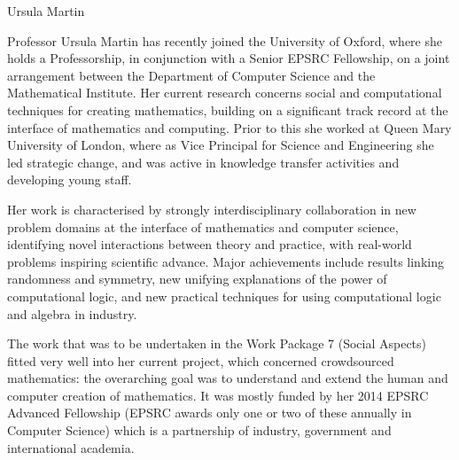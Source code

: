 \begin{participant}[type=PI,PM=2,gender=female]{Ursula Martin}

  Professor Ursula Martin has recently joined the University of Oxford, where she holds a
  Professorship, in conjunction with a Senior EPSRC Fellowship, on a joint arrangement
  between the Department of Computer Science and the Mathematical Institute. Her current
  research concerns social and computational techniques for creating mathematics, building
  on a significant track record at the interface of mathematics and computing. Prior to
  this she worked at Queen Mary University of London, where as Vice Principal for Science
  and Engineering she led strategic change, and was active in knowledge transfer
  activities and developing young staff.

Her work is characterised by strongly interdisciplinary collaboration in new
problem domains at the interface of mathematics and computer science,
identifying novel interactions between theory and practice, with real-world
problems inspiring scientific advance. Major achievements include results
linking randomness and symmetry, new unifying explanations of the power of
computational logic, and new practical techniques for using computational logic
and algebra in industry.

The work that was to be undertaken in the Work Package 7 (Social Aspects) fitted very well
into her current project, which concerned crowdsourced mathematics: the overarching goal was
to understand and extend the human and computer creation of mathematics. 
It was mostly funded by her
2014 EPSRC Advanced Fellowship (EPSRC awards only one or two of these annually
in Computer Science) which is a partnership of industry, government and international
academia.  
\end{participant}
